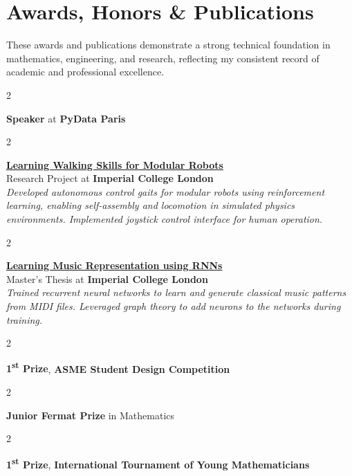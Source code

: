 \documentclass[10pt, letterpaper]{article}
\newenvironment{twocolentry}[2][]{
    \onecolentry
    \def\secondColumn{#2}
    \setcolumnwidth{\fill, 4.5 cm}
    \begin{paracol}{2}
}{
    \switchcolumn \raggedleft \secondColumn
    \end{paracol}
    \endonecolentry
}
\begin{document}
    \section{Awards, Honors \& Publications}
    These awards and publications demonstrate a strong technical foundation in mathematics, engineering, and research, reflecting my consistent record of academic and professional excellence.
    \begin{twocolentry}{2015}
        \textbf{Speaker} at \textbf{PyData Paris}
    \end{twocolentry}

    \begin{twocolentry}{2014}
        \textbf{\href{https://github.com/clement91190/rp/blob/master/paper/main.pdf}{Learning Walking Skills for Modular Robots}} \\
        Research Project at \textbf{Imperial College London} \\
        \textit{Developed autonomous control gaits for modular robots using reinforcement learning, enabling self-assembly and locomotion in simulated physics environments. Implemented joystick control interface for human operation.}
    \end{twocolentry}

    \begin{twocolentry}{2014}
        \textbf{\href{https://github.com/clement91190/musicbot}{Learning Music Representation using RNNs}} \\
        Master's Thesis at \textbf{Imperial College London} \\
        \textit{Trained recurrent neural networks to learn and generate classical music patterns from MIDI files. Leveraged graph theory to add neurons to the networks during training.}
    \end{twocolentry}

    \begin{twocolentry}{2012}
        \textbf{1\textsuperscript{st} Prize}, \textbf{ASME Student Design Competition}
    \end{twocolentry}

    \begin{twocolentry}{2010}
        \textbf{Junior Fermat Prize} in Mathematics
    \end{twocolentry}

    \begin{twocolentry}{2010}
        \textbf{1\textsuperscript{st} Prize}, \textbf{International Tournament of Young Mathematicians}
    \end{twocolentry}
\end{document}

